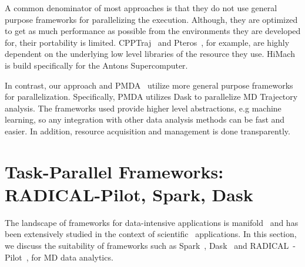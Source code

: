 

A common denominator of most approaches is that they do not use general purpose frameworks for parallelizing the execution.
Although, they are optimized to get as much performance as possible from the environments they are developed for, their portability is limited.
CPPTraj~\cite{roe2018parallelization} and Pteros~\cite{yesylevskyy2015pteros}, for example, are highly dependent on the underlying low level libraries of the resource they use.
HiMach~\cite{tiankai2008scalable} is build specifically for the Antons Supercomputer.

In contrast, our approach and PMDA~\cite{fan2019pmda} utilize more general purpose frameworks for parallelization.
Specifically, PMDA utilizes Dask to parallelize MD Trajectory analysis.
The frameworks used provide higher level abstractions, e.g machine learning, so any  integration with other data analysis methods can be fast and easier.
In addition, resource acquisition and management is done transparently.

\section{Task-Parallel Frameworks: RADICAL-Pilot, Spark, Dask}
\label{ssec:frameworks}
The landscape of frameworks for data-intensive applications is manifold~\cite{jha2014tale,kamburugamuve2017anatomy} and has been extensively studied in the context of scientific~\cite{jha2017introducing} applications.
In this section, we discuss the suitability of frameworks such as Spark~\cite{zaharia2010spark}, Dask~\cite{rocklin2015dask} and RADICAL~-Pilot~\cite{merzky2019using}, for MD data analytics.


